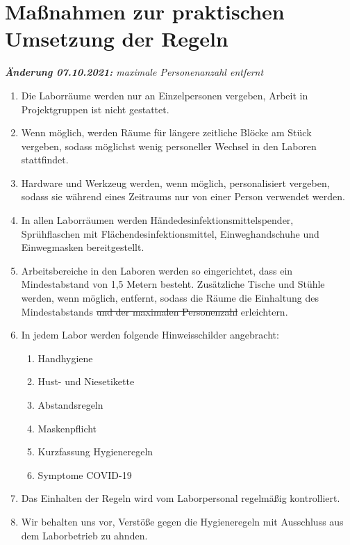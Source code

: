 \section{Maßnahmen zur praktischen Umsetzung der Regeln}\label{sec:umsetzung}

\noindent
\emph{\textbf{Änderung 07.10.2021:} maximale Personenanzahl entfernt}
\medskip

\begin{enumerate}
    \item Die Laborräume werden nur an Einzelpersonen vergeben, Arbeit in Projektgruppen ist nicht gestattet.
    \item Wenn möglich, werden Räume für längere zeitliche Blöcke am Stück vergeben, sodass möglichst wenig personeller Wechsel in den Laboren stattfindet.
    \item Hardware und Werkzeug werden, wenn möglich, personalisiert vergeben, sodass sie während eines Zeitraums nur von einer Person verwendet werden.
    \item In allen Laborräumen werden Händedesinfektionsmittelspender, Sprühflaschen mit Flächendesinfektionsmittel, Einweghandschuhe und Einwegmasken bereitgestellt. 
    \item Arbeitsbereiche in den Laboren werden so eingerichtet, dass ein Mindestabstand von 1,5 Metern besteht. Zusätzliche Tische und Stühle werden, wenn möglich, entfernt, sodass die Räume die Einhaltung des Mindestabstands \sout{und der maximalen Personenzahl} erleichtern.
    \item In jedem Labor werden folgende Hinweisschilder angebracht:
    \begin{enumerate}
        \item Handhygiene
        \item Hust- und Niesetikette
        \item Abstandsregeln
        \item Maskenpflicht
        \item Kurzfassung Hygieneregeln
        \item Symptome COVID-19
    \end{enumerate}
    \item Das Einhalten der Regeln wird vom Laborpersonal regelmäßig kontrolliert.
    \item Wir behalten uns vor, Verstöße gegen die Hygieneregeln mit Ausschluss aus dem Laborbetrieb zu ahnden.
\end{enumerate}
